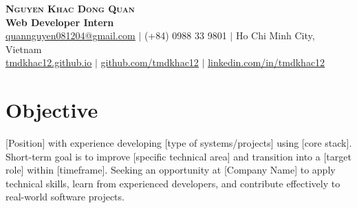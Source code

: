 \documentclass[letterpaper,11pt]{article}
\begin{document}
\begin{flushright}
  \color{gray}
\end{flushright}

\vspace{-5pt}

\begin{center}
  \textbf{\Huge \scshape Nguyen Khac Dong Quan} \\ \vspace{4pt}
  \small \textbf{Web Developer Intern} \\ \vspace{4pt}
  \small
   \href{mailto:quannguyen081204@gmail.com}{\underline{quannguyen081204@gmail.com}} $|$
   (+84) 0988 33 9801 $|$
   Ho Chi Minh City, Vietnam \\ \vspace{4pt}
   \href{https://tmdkhac12.github.io/}{\underline{tmdkhac12.github.io}} $|$
   \href{https://github.com/tmdkhac12}{\underline{github.com/tmdkhac12}} $|$
   \href{https://linkedin.com/in/tmdkhac12}{\underline{linkedin.com/in/tmdkhac12}}
\end{center}

\section{Objective}
\small{[Position] with experience developing [type of systems/projects] using [core stack].
  Short-term goal is to improve [specific technical area] and transition into a [target role] within [timeframe].
  Seeking an opportunity at [Company Name] to apply technical skills, learn from experienced developers, and contribute effectively to real-world software projects.}

\end{document}
